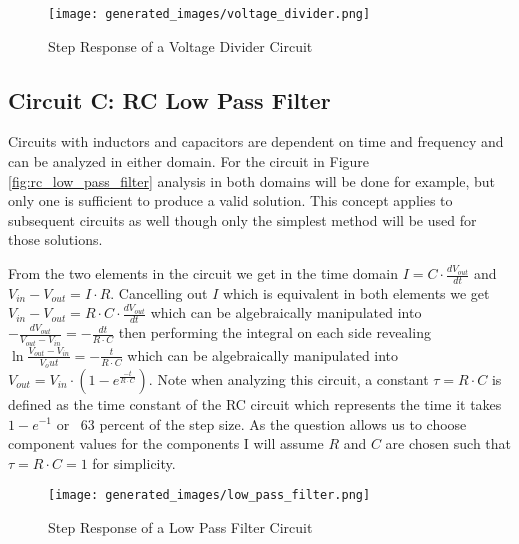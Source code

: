 \documentclass[main.tex]{subfiles}
\begin{document}
\begin{figure}[H]
    \centering
    \texttt{[image: generated\_images/voltage\_divider.png]}
    \caption{Step Response of a Voltage Divider Circuit}
    \label{fig:step-response-voltage-divider}
\end{figure}



\subsection{Circuit C: RC Low Pass Filter}
Circuits with inductors and capacitors are dependent on time and frequency and can be analyzed in either domain. For the circuit in Figure \ref{fig:rc_low_pass_filter} analysis in both domains will be done for example, but only one is sufficient to produce a valid solution. This concept applies to subsequent circuits as well though only the simplest method will be used for those solutions.

From the two elements in the circuit we get in the time domain $I = C \cdot \frac{dV_{out}}{dt}$ and $V_{in} - V_{out} = I \cdot R$. Cancelling out $I$ which is equivalent in both elements we get $V_{in} - V_{out} = R \cdot C \cdot \frac{dV_{out}}{dt}$ which can be algebraically manipulated into $-\frac{dV_{out}}{V_{out}-V_{in}} = -\frac{dt}{R \cdot C}$ then performing the integral on each side revealing $\ln{\frac{V_{out}-V_{in}}{V_out}}=-\frac{t}{R \cdot C}$ which can be algebraically manipulated into $V_{out}=V_{in} \cdot (1-e^{\frac{-t}{R \cdot C}})$. Note when analyzing this circuit, a constant $\tau = R \cdot C$ is defined as the time constant of the RC circuit which represents the time it takes $1-e^{-1}$ or ~63 percent of the step size. As the question allows us to choose component values for the components I will assume $R$ and $C$ are chosen such that $\tau = R \cdot C = 1$ for simplicity.

\begin{figure}[H]
    \centering
    \texttt{[image: generated\_images/low\_pass\_filter.png]}
    \caption{Step Response of a Low Pass Filter Circuit}
    \label{fig:step-response-low-pass-filter}
\end{figure}
\end{document}
